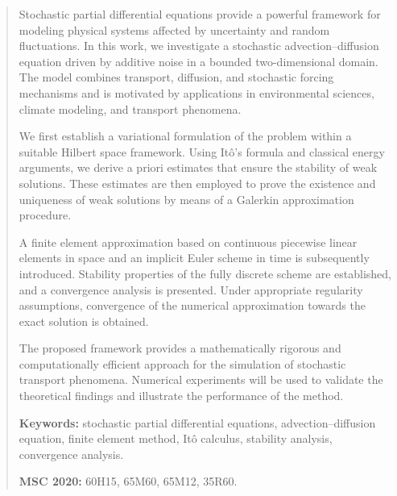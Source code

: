 \begin{abstract}

Stochastic partial differential equations provide a powerful framework for modeling physical systems affected by uncertainty and random fluctuations. In this work, we investigate a stochastic advection--diffusion equation driven by additive noise in a bounded two-dimensional domain. The model combines transport, diffusion, and stochastic forcing mechanisms and is motivated by applications in environmental sciences, climate modeling, and transport phenomena.

We first establish a variational formulation of the problem within a suitable Hilbert space framework. Using Itô's formula and classical energy arguments, we derive a priori estimates that ensure the stability of weak solutions. These estimates are then employed to prove the existence and uniqueness of weak solutions by means of a Galerkin approximation procedure.

A finite element approximation based on continuous piecewise linear elements in space and an implicit Euler scheme in time is subsequently introduced. Stability properties of the fully discrete scheme are established, and a convergence analysis is presented. Under appropriate regularity assumptions, convergence of the numerical approximation towards the exact solution is obtained.

The proposed framework provides a mathematically rigorous and computationally efficient approach for the simulation of stochastic transport phenomena. Numerical experiments will be used to validate the theoretical findings and illustrate the performance of the method.

\medskip

\noindent
\textbf{Keywords:}
stochastic partial differential equations,
advection--diffusion equation,
finite element method,
Itô calculus,
stability analysis,
convergence analysis.

\medskip

\noindent
\textbf{MSC 2020:}
60H15,
65M60,
65M12,
35R60.

\end{abstract}